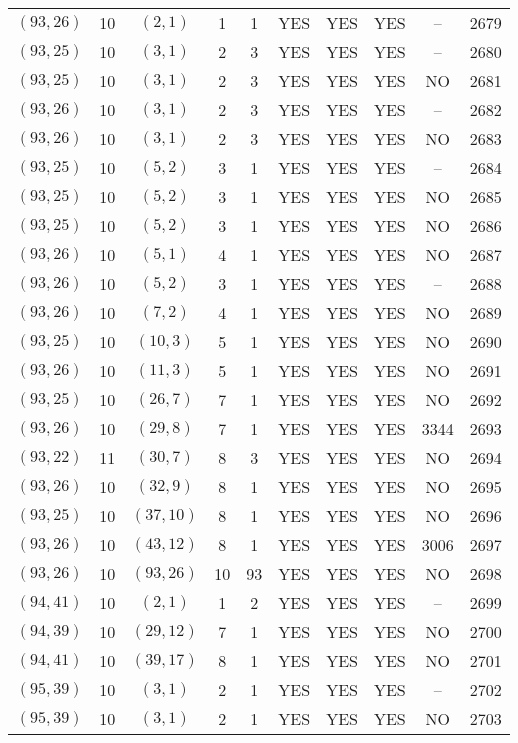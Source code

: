 \begin{longtable}{|c|c|c|c|c|c|c|c|c|c|}
$(93, 26)$ & 10 & $(2, 1)$ & 1 & 1 & YES & YES & YES & -- & 2679\\
$(93, 25)$ & 10 & $(3, 1)$ & 2 & 3 & YES & YES & YES & -- & 2680\\
$(93, 25)$ & 10 & $(3, 1)$ & 2 & 3 & YES & YES & YES & NO & 2681\\
$(93, 26)$ & 10 & $(3, 1)$ & 2 & 3 & YES & YES & YES & -- & 2682\\
$(93, 26)$ & 10 & $(3, 1)$ & 2 & 3 & YES & YES & YES & NO & 2683\\
$(93, 25)$ & 10 & $(5, 2)$ & 3 & 1 & YES & YES & YES & -- & 2684\\
$(93, 25)$ & 10 & $(5, 2)$ & 3 & 1 & YES & YES & YES & NO & 2685\\
$(93, 25)$ & 10 & $(5, 2)$ & 3 & 1 & YES & YES & YES & NO & 2686\\
$(93, 26)$ & 10 & $(5, 1)$ & 4 & 1 & YES & YES & YES & NO & 2687\\
$(93, 26)$ & 10 & $(5, 2)$ & 3 & 1 & YES & YES & YES & -- & 2688\\
$(93, 26)$ & 10 & $(7, 2)$ & 4 & 1 & YES & YES & YES & NO & 2689\\
$(93, 25)$ & 10 & $(10, 3)$ & 5 & 1 & YES & YES & YES & NO & 2690\\
$(93, 26)$ & 10 & $(11, 3)$ & 5 & 1 & YES & YES & YES & NO & 2691\\
$(93, 25)$ & 10 & $(26, 7)$ & 7 & 1 & YES & YES & YES & NO & 2692\\
$(93, 26)$ & 10 & $(29, 8)$ & 7 & 1 & YES & YES & YES & 3344 & 2693\\
$(93, 22)$ & 11 & $(30, 7)$ & 8 & 3 & YES & YES & YES & NO & 2694\\
$(93, 26)$ & 10 & $(32, 9)$ & 8 & 1 & YES & YES & YES & NO & 2695\\
$(93, 25)$ & 10 & $(37, 10)$ & 8 & 1 & YES & YES & YES & NO & 2696\\
$(93, 26)$ & 10 & $(43, 12)$ & 8 & 1 & YES & YES & YES & 3006 & 2697\\
$(93, 26)$ & 10 & $(93, 26)$ & 10 & 93 & YES & YES & YES & NO & 2698\\
$(94, 41)$ & 10 & $(2, 1)$ & 1 & 2 & YES & YES & YES & -- & 2699\\
$(94, 39)$ & 10 & $(29, 12)$ & 7 & 1 & YES & YES & YES & NO & 2700\\
$(94, 41)$ & 10 & $(39, 17)$ & 8 & 1 & YES & YES & YES & NO & 2701\\
$(95, 39)$ & 10 & $(3, 1)$ & 2 & 1 & YES & YES & YES & -- & 2702\\
$(95, 39)$ & 10 & $(3, 1)$ & 2 & 1 & YES & YES & YES & NO & 2703\\

\end{longtable}
